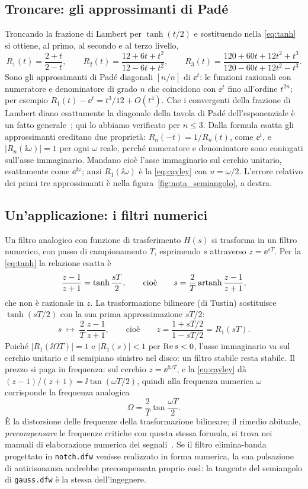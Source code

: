 \subsection{Troncare: gli approssimanti di Pad\'e}

Troncando la frazione di Lambert per $\tanh(t/2)$ e sostituendo nella
\eqref{eq:tanh} si ottiene, al primo, al secondo e al terzo livello,
\[
  R_1(t)=\frac{2+t}{2-t},\qquad
  R_2(t)=\frac{12+6t+t^2}{12-6t+t^2},\qquad
  R_3(t)=\frac{120+60t+12t^2+t^3}{120-60t+12t^2-t^3}.
\]
Sono gli approssimanti di Pad\'e diagonali $[n/n]$ di $\ee^{t}$: le funzioni
razionali con numeratore e denominatore di grado $n$ che coincidono con
$\ee^{t}$ fino all'ordine $t^{2n}$; per esempio
$R_1(t)-\ee^{t}=t^3/12+O(t^4)$. Che i convergenti della frazione di Lambert
diano esattamente la diagonale della tavola di Pad\'e dell'esponenziale \`e
un fatto generale~\cite{baker1996}; qui lo abbiamo verificato per
$n\le3$. Dalla formula esatta gli approssimanti ereditano due propriet\`a:
$R_n(-t)=1/R_n(t)$, come $\ee^{t}$, e $|R_n(\ii\omega)|=1$ per ogni $\omega$
reale, perch\'e numeratore e denominatore sono coniugati sull'asse
immaginario. Mandano cio\`e l'asse immaginario sul cerchio unitario,
esattamente come $\ee^{\ii\omega}$; anzi $R_1(\ii\omega)$ \`e la
\eqref{eq:cayley} con $u=\omega/2$. L'errore relativo dei primi tre
approssimanti \`e nella figura~\ref{fig:nota_semiangolo}, a destra.

\subsection{Un'applicazione: i filtri numerici}

Un filtro analogico con funzione di trasferimento $H(s)$ si trasforma in un
filtro numerico, con passo di campionamento $T$, esprimendo $s$ attraverso
$z=\ee^{sT}$. Per la \eqref{eq:tanh} la relazione esatta \`e
\[
  \frac{z-1}{z+1}=\tanh\frac{sT}{2},
  \qquad\text{cio\`e}\qquad
  s=\frac2T\operatorname{artanh}\frac{z-1}{z+1},
\]
che non \`e razionale in $z$. La trasformazione bilineare (di Tustin)
sostituisce $\tanh(sT/2)$ con la sua prima approssimazione $sT/2$:
\[
  s\;\mapsto\;\frac2T\,\frac{z-1}{z+1},
  \qquad\text{cio\`e}\qquad
  z=\frac{1+sT/2}{1-sT/2}=R_1(sT).
\]
Poich\'e $|R_1(\ii\Omega T)|=1$ e $|R_1(s)|<1$ per $\operatorname{Re} s<0$, l'asse
immaginario va sul cerchio unitario e il semipiano sinistro nel disco: un
filtro stabile resta stabile. Il prezzo si paga in frequenza: sul cerchio
$z=\ee^{\ii\omega T}$, e la \eqref{eq:cayley} d\`a
$(z-1)/(z+1)=\ii\tan(\omega T/2)$, quindi alla frequenza numerica $\omega$
corrisponde la frequenza analogica
\[
  \Omega=\frac2T\tan\frac{\omega T}{2}.
\]
\`E la distorsione delle frequenze della trasformazione bilineare; il rimedio
abituale, \emph{precompensare} le frequenze critiche con questa stessa
formula, si trova nei manuali di elaborazione numerica dei
segnali~\cite{oppenheim2010}. Se il filtro elimina-banda progettato in
\texttt{notch.dfw} venisse realizzato in forma numerica, la sua pulsazione di
antirisonanza andrebbe precompensata proprio cos\`i: la tangente del
semiangolo di \texttt{gauss.dfw} \`e la stessa dell'ingegnere.

